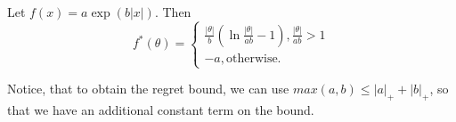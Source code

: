 \documentclass{colt2016_empty} %
\begin{document}
\begin{theorem}
Let $f(x)=a \exp(b |x|)$. Then 
\[
f^*(\theta) = 
\begin{cases}
\frac{|\theta|}{b} \left(\ln \frac{|\theta|}{a b}-1\right),  \frac{|\theta|}{a b} > 1 \\
-a,  \text{otherwise.}
\end{cases}
\]
\end{theorem}

Notice, that to obtain the regret bound, we can use $max(a,b)\leq |a|_+ + |b|_+$, so that we have an additional constant term on the bound.


\end{document}
